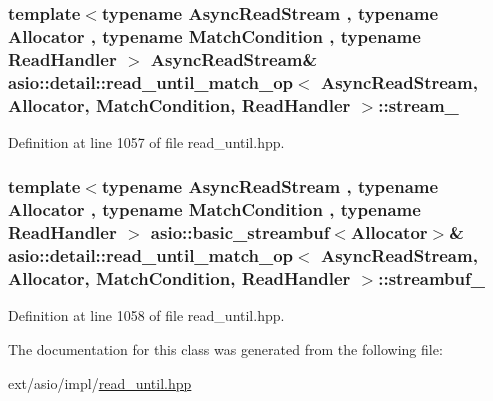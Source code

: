 \subsubsection[{stream\+\_\+}]{\setlength{\rightskip}{0pt plus 5cm}template$<$typename Async\+Read\+Stream , typename Allocator , typename Match\+Condition , typename Read\+Handler $>$ Async\+Read\+Stream\& {\bf asio\+::detail\+::read\+\_\+until\+\_\+match\+\_\+op}$<$ Async\+Read\+Stream, Allocator, Match\+Condition, Read\+Handler $>$\+::stream\+\_\+}\label{classasio_1_1detail_1_1read__until__match__op_a4dd4e8d24de8028f6aafe609887913a9}


Definition at line 1057 of file read\+\_\+until.\+hpp.

\hypertarget{classasio_1_1detail_1_1read__until__match__op_aa4a3b07023c4e23029f57bd6667a8834}{}
\subsubsection[{streambuf\+\_\+}]{\setlength{\rightskip}{0pt plus 5cm}template$<$typename Async\+Read\+Stream , typename Allocator , typename Match\+Condition , typename Read\+Handler $>$ {\bf asio\+::basic\+\_\+streambuf}$<$Allocator$>$\& {\bf asio\+::detail\+::read\+\_\+until\+\_\+match\+\_\+op}$<$ Async\+Read\+Stream, Allocator, Match\+Condition, Read\+Handler $>$\+::streambuf\+\_\+}\label{classasio_1_1detail_1_1read__until__match__op_aa4a3b07023c4e23029f57bd6667a8834}


Definition at line 1058 of file read\+\_\+until.\+hpp.



The documentation for this class was generated from the following file\+:\begin{DoxyCompactItemize}
\item 
ext/asio/impl/\hyperlink{impl_2read__until_8hpp}{read\+\_\+until.\+hpp}\end{DoxyCompactItemize}
